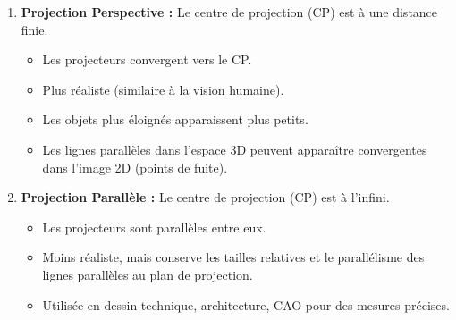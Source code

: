 \documentclass{article}
\begin{document}
\begin{enumerate}
    \item \textbf{Projection Perspective :} Le centre de projection (CP) est à une distance finie.
        \begin{itemize}
            \item Les projecteurs convergent vers le CP.
            \item Plus réaliste (similaire à la vision humaine).
            \item Les objets plus éloignés apparaissent plus petits.
            \item Les lignes parallèles dans l'espace 3D peuvent apparaître convergentes dans l'image 2D (points de fuite).
        \end{itemize}
    \item \textbf{Projection Parallèle :} Le centre de projection (CP) est à l'infini.
        \begin{itemize}
            \item Les projecteurs sont parallèles entre eux.
            \item Moins réaliste, mais conserve les tailles relatives et le parallélisme des lignes parallèles au plan de projection.
            \item Utilisée en dessin technique, architecture, CAO pour des mesures précises.
        \end{itemize}
\end{enumerate}
\end{document}
